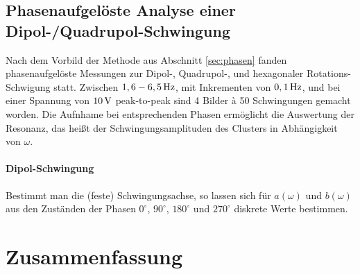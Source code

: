 \documentclass[numbers=noenddot,a4paper,notitlepage,twoside,BCOR15mm]{scrbook}
\newcommand{\degree}{^\circ}
\begin{document}
				\subsection{Phasenaufgelöste Analyse einer Dipol-/Quadrupol-Schwingung}

					Nach dem Vorbild der Methode aus Abschnitt \ref{sec:phasen} fanden phasenaufgelöste Messungen zur Dipol-, Quadrupol-, und hexagonaler Rotations-Schwigung statt. Zwischen $\unit[1,6-6,5]{Hz}$, mit Inkrementen von $\unit[0,1]{Hz}$, und bei einer Spannung von $\unit[10]{V}$ peak-to-peak sind 4 Bilder à 50 Schwingungen gemacht worden. Die Aufnhame bei entsprechenden Phasen ermöglicht die Auswertung der Resonanz, das heißt der Schwingungsamplituden des Clusters in Abhängigkeit von $\omega$.\\

					\paragraph{Dipol-Schwingung}

						Bestimmt man die (feste) Schwingungsachse, so lassen sich für $a\left(\omega\right)$ und $b\left(\omega\right)$ aus den Zuständen der Phasen $0\degree$, $90\degree$, $180\degree$ und $270\degree$ diskrete Werte bestimmen. 

	\newpage

		\section{Zusammenfassung}

		
		

\end{document}
